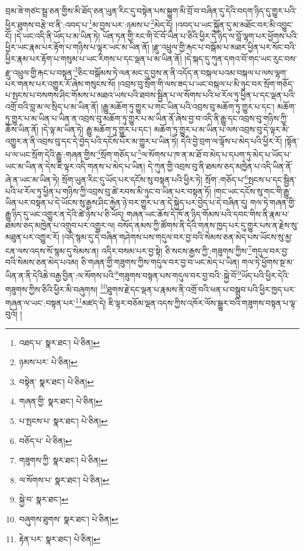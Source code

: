 བྲམ་ཟེ་གཙང་སྦྲ་ཅན་གྱིས་མི་ཐོད་ཅན་ཡུན་རིང་དུ་བསྟེན་པས་སྐྱུག་མི་བྲོ་བ་བཞིན་དུ་དེའི་བདག་ཉིད་དུ་གྱུར་པའི་ཕྱིར་ཐུགས་བརྩེ་བ་ནི་:འབད་པ་\footnote{འཐད་པ་  སྣར་ཐང་།  པེ་ཅིན། }མ་བྱས་པར་:ཉམས་པ་\footnote{ཉམས་པར་  པེ་ཅིན། }མེད་དོ། །འབད་པ་ཡང་སྐྱོན་དུ་མ་མཐོང་བར་མི་འབྱུང་ངོ། །དེ་ཡང་འདི་ནི་ཡོད་པ་མ་ཡིན་ཏེ། ཡོན་ཏན་གྱི་རང་གི་ངོ་བོ་ཡིན་པ་ཅིའི་ཕྱིར་དེ་ཉིད་ལ་བློ་ལྷག་པར་ཕྱོགས་པའི་ཕྱིར་ཡང་རྣམ་པར་རྟོག་པ་གཉིས་པ་ལྟར་ཡང་མ་ཡིན་ནོ། །རྫུ་འཕྲུལ་གྱི་རྐང་པ་བསྒོམ་པ་མཐར་ཕྱིན་པར་སོང་བའི་ཕྱིར་རྣམ་པར་རྟོག་པ་གསུམ་པ་ཡང་རིགས་པ་དང་ལྡན་པ་མ་ཡིན་ནོ། །དེ་སྐད་དུ་ཀུན་དགའ་བོ་གང་ཡང་རུང་བས་རྫུ་འཕྲུལ་གྱི་རྐང་པ་བསྟན་\footnote{བསྟེན་  སྣར་ཐང་།  པེ་ཅིན། }ཅིང་བསྒོམས་ཏེ་ལན་མང་དུ་བྱས་ན་ནི་འདོད་ན་བསྐལ་པའམ་བསྐལ་པ་ལས་ལྷག་པར་གནས་པར་འགྱུར་རོ་ཞེས་གསུངས་སོ། །འབྲས་བུ་སྲོག་གི་ལས་ཟད་པ་ཡང་བསྐལ་པ་མི་ཉུང་བར་སྲོག་གཅོད་པ་སྤངས་པ་བསགས་ཤིང་གོམས་པ་མཐའ་ཡས་པའི་ཐབས་སྦྱིན་པ་ལ་སོགས་པའི་ཕ་རོལ་ཏུ་ཕྱིན་པ་དང་ལྡན་པའི་འགྲོ་བའི་བླ་མ་ལ་སྲིད་པ་མ་ཡིན་ནོ། །རྒྱུ་མཆོག་ཏུ་གྱུར་པ་གང་ཡིན་པའི་འབྲས་བུ་མཆོག་ཏུ་གྱུར་པ་དང་། མཆོག་ཏུ་གྱུར་པ་མ་ཡིན་པ་ཡིན་ན་འབྲས་བུ་མཆོག་ཏུ་གྱུར་པ་མ་ཡིན་ནོ་ཞེས་བྱ་བ་འདི་ནི་རྒྱུ་དང་འབྲས་བུ་གཉིས་ཀྱི་ཆོས་ཡིན་ནོ། །དེ་ལྟ་མ་ཡིན་ཏེ། རྒྱུ་མཆོག་ཏུ་གྱུར་པ་དང་། མཆོག་ཏུ་གྱུར་པ་མ་ཡིན་པ་ལས་འབྲས་བུ་དེ་ལྟར་མི་འགྱུར་ན་ནི་འབྲས་བུ་དང་དེ་བྱེད་པའི་དངོས་པོར་མ་གྱུར་པ་ཡིན་ཏེ། དེའི་བྱེ་བྲག་ལ་ལྟོས་པ་མེད་པའི་ཕྱིར་རོ། །སྟོན་པ་ལ་ཡང་སྲོག་དེའི་རྒྱུ་:གཞན་གྱིས་\footnote{གཞན་གྱི་  སྣར་ཐང་།  པེ་ཅིན། }སྲོག་གཅོད་པ་\footnote{པ་སྤངས་པ་  སྣར་ཐང་།  པེ་ཅིན། }ལ་སོགས་པ་ཁ་ན་མ་ཐོ་བ་མེད་པ་དཔག་ཏུ་མེད་པ་ཡོད་པ་ཡང་མ་ཡིན་ན་དེས་ཇི་ལྟར་འདི་གནས་པ་མེད་པ་ཡིན། དེ་ཀུན་གྱི་འབྲས་བུ་ནི་ཐམས་ཅད་མཁྱེན་པ་འདི་ཡིན་ནོ་ཞེ་ན་ཡང་མ་ཡིན་ཏེ། སྲོག་ཡུན་རིང་དུ་ཡོད་པར་དངོས་སུ་བསྟན་པའི་ཕྱིར་ཏེ། སྲོག་:གཅོད་པ་\footnote{བཅོད་པ་  པེ་ཅིན། }སྤངས་པ་དང་སྦྱིན་པའི་ཕ་རོལ་ཏུ་ཕྱིན་པ་གཉིས་ཀྱི་འབྲས་བུ་ཚེ་རབས་མི་ཉུང་བ་ཡིན་པར་བསྟན་ཏོ། །གང་ཡང་དངོས་སུ་གང་གི་རྒྱུ་ཡིན་པར་བསྟན་པ་དེ་ཡོངས་སུ་རྒྱས་ཤིང་རྐྱེན་ཉེ་བར་གྱུར་པ་ན་དེ་སྐྱེད་པར་བྱེད་པ་དེ་བཞིན་དུ། གལ་ཏེ་གཞན་གྱི་རྒྱུ་ཉིད་དུ་ཡང་འགྱུར་ན་དེའི་ཚེ་ཉེས་པ་ཅི་ཡོད། གཞན་ཡང་ཆོས་དེ་ཁོ་ན་ཉིད་གོམས་པའི་དབང་གིས་ནི་རྣམ་པ་ཐམས་ཅད་མཁྱེན་པ་འགྲུབ་པར་འགྱུར་ལ། བསོད་ནམས་ཀྱི་ཚོགས་ནི་དེའི་གནས་ཁྱད་པར་དུ་གྱུར་པས་ན་རྗེས་སུ་མཐུན་པར་འགྱུར་རོ། །འདི་སྙམ་དུ་དེ་བཞིན་གཤེགས་པས་གདུལ་བར་བྱ་བའི་སེམས་ཅན་མེད་པས་ཡོངས་སུ་མྱ་ངན་ལས་འདས་སོ་སྙམ་དུ་སེམས་ན། འདིར་བསམ་པར་བྱ་སྟེ། ཅི་སངས་རྒྱས་ཀྱི་:གཟུགས་ཀྱིས་\footnote{གཟུགས་ཀྱི་  སྣར་ཐང་།  པེ་ཅིན། }གདུལ་བར་བྱ་བའི་སེམས་ཅན་མེད་པའམ། ཅི་གཞན་གྱི་གཟུགས་ཀྱིས་གདུལ་བར་བྱ་བ་ཡང་མེད་པ་ཡིན། གལ་ཏེ་ཕྱོགས་སྔ་མ་ཡིན་ན་ནི་དེའིཆེ་བརྒྱ་བྱིན་:ལ་སོགས་པའི་\footnote{ལ་སོགས་པ་  སྣར་ཐང་།  པེ་ཅིན། }གཟུགས་བསྟན་པས་གདུལ་བར་བྱ་བའི་:སྐྱེ་བོ་\footnote{སྐྱེ་བ་  སྣར་ཐང་། }ཡོད་པའི་ཕྱིར་དེའི་གཟུགས་ཀྱིས་ཅིའི་ཕྱིར་མི་བཞུགས། \footnote{བཞུགས་ཐུགས་  སྣར་ཐང་།  པེ་ཅིན། }ཐུགས་རྗེ་དང་ལྡན་པ་རྣམས་ནི་འགྲོ་བའི་ཕན་པ་བསྒྲུབ་པའི་ཕྱིར་ཁྱད་པར་གཞན་ལ་ཡང་:བསྟན་པར་\footnote{རྟེན་པར་  སྣར་ཐང་།  པེ་ཅིན། }མཛད་དེ། ཇི་ལྟར་བཅོམ་ལྡན་འདས་ཀྱིས་འཁོར་ལོས་སྒྱུར་བའི་གཟུགས་བསྟན་པ་ལྟ་བུའོ། །
